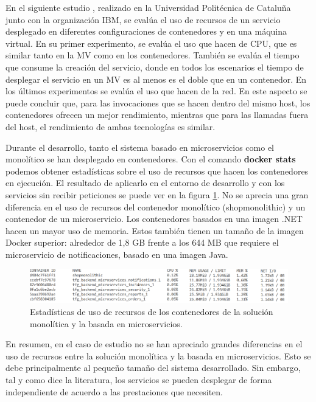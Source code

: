\documentclass[11pt,spanish,listoffigures]{tfgetsinf}
\begin{document}
En el siguiente estudio \cite{Amaral2016}, realizado en la Universidad Politécnica de Cataluña junto con la organización IBM, se evalúa el uso de recursos de un servicio desplegado en diferentes configuraciones de contenedores y en una máquina virtual. En su primer experimento, se evalúa el uso que hacen de CPU, que es similar tanto en la MV como en los contenedores. También se evalúa el tiempo que consume la creación del servicio, donde en todos los escenarios el tiempo de desplegar el servicio en un MV es al menos es el doble que en un contenedor. En los últimos experimentos se evalúa el uso que hacen de la red. En este aspecto se puede concluir que, para las invocaciones que se hacen dentro del mismo host, los contenedores ofrecen un mejor rendimiento, mientras que para las llamadas fuera del host, el rendimiento de ambas tecnologías es similar.

Durante el desarrollo, tanto el sistema basado en microservicios como el monolítico se han desplegado en contenedores. Con el comando \textbf{docker stats} podemos obtener estadísticas sobre el uso de recursos que hacen los contenedores en ejecución. El resultado de aplicarlo en el entorno de desarrollo y con los servicios sin recibir peticiones se puede ver en la figura \ref{fig:UsoRecursos}. No se aprecia una gran diferencia en el uso de recursos del contenedor monolítico (shopmonolithic) y un contenedor de un microservicio. Los contenedores basados en una imagen .NET hacen un mayor uso de memoria. Estos también tienen un tamaño de la imagen Docker superior: alrededor de 1,8 GB frente a los 644 MB que requiere el microservicio de notificaciones, basado en una imagen Java.

\begin{figure}[h]
\centering
\includegraphics[scale=0.65]{useMemory}
\caption{Estadísticas de uso de recursos de los contenedores de la solución monolítica y la basada en microservicios.}
\label{fig:UsoRecursos}
\end{figure}

En resumen, en el caso de estudio no se han apreciado grandes diferencias en el uso de recursos entre la solución monolítica y la basada en microservicios. Esto se debe principalmente al pequeño tamaño del sistema desarrollado. Sin embargo, tal y como dice la literatura, los servicios se pueden desplegar de forma independiente de acuerdo a las prestaciones que necesiten.
\end{document}
